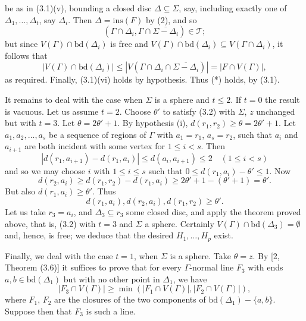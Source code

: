 \noindent be as in (3.1)(v), bounding a closed disc $\Delta \subseteq \Sigma$, say, including exactly one of $\Delta_1, \dots, \Delta_t$, say $\Delta_i$. Then $\Delta = \text{ins}(F)$ by (2), and so
\begin{equation*}
(\Gamma \cap \Delta_i, \Gamma \cap \overline{\Sigma - \Delta_i}) \in \mathscr{T};
\end{equation*}
but since $V(\Gamma) \cap \text{bd}(\Delta_i)$ is free and $V(\Gamma) \cap \text{bd}(\Delta_i) \subseteq V(\Gamma \cap \Delta_i)$, it follows that
\begin{equation*}
|V(\Gamma) \cap \text{bd}(\Delta_i)| \le |V(\Gamma \cap \Delta_i \cap \overline{\Sigma - \Delta_i})| = |F \cap V(\Gamma)|,
\end{equation*}
as required. Finally, (3.1)(vi) holds by hypothesis. Thus (*) holds, by (3.1).

It remains to deal with the case when $\Sigma$ is a sphere and $t \le 2$. If $t = 0$ the result is vacuous. Let us assume $t = 2$. Choose $\theta'$ to satisfy (3.2) with $\Sigma$, $z$ unchanged but with $t = 3$. Let $\theta = 2\theta' + 1$. By hypothesis (i), $d(r_1, r_2) \ge \theta = 2\theta' + 1$. Let $a_1, a_2, \dots, a_s$ be a sequence of regions of $\Gamma$ with $a_1 = r_1$, $a_s = r_2$, such that $a_i$ and $a_{i+1}$ are both incident with some vertex for $1 \le i < s$. Then
\begin{equation*}
|d(r_1, a_{i+1}) - d(r_1, a_i)| \le d(a_i, a_{i+1}) \le 2 \quad (1 \le i < s)
\end{equation*}
and so we may choose $i$ with $1 \le i \le s$ such that $0 \le d(r_1, a_i) - \theta' \le 1$. Now
\begin{equation*}
d(r_2, a_i) \ge d(r_1, r_2) - d(r_1, a_i) \ge 2\theta' + 1 - (\theta' + 1) = \theta'.
\end{equation*}
But also $d(r_1, a_i) \ge \theta'$. Thus
\begin{equation*}
d(r_1, a_i), d(r_2, a_i), d(r_1, r_2) \ge \theta'.
\end{equation*}
Let us take $r_3 = a_i$, and $\Delta_3 \subseteq r_3$ some closed disc, and apply the theorem proved above, that is, (3.2) with $t = 3$ and $\Sigma$ a sphere. Certainly $V(\Gamma) \cap \text{bd}(\Delta_3) = \emptyset$ and, hence, is free; we deduce that the desired $H_1, \dots, H_p$ exist.

Finally, we deal with the case $t = 1$, when $\Sigma$ is a sphere. Take $\theta = z$. By [2, Theorem (3.6)] it suffices to prove that for every $\Gamma$-normal line $F_3$ with ends $a, b \in \text{bd}(\Delta_1)$ but with no other point in $\Delta_1$, we have
\begin{equation*}
|F_3 \cap V(\Gamma)| \ge \min (|F_1 \cap V(\Gamma)|, |F_2 \cap V(\Gamma)|),
\end{equation*}
where $F_1$, $F_2$ are the closures of the two components of $\text{bd}(\Delta_1) - \{a, b\}$. Suppose then that $F_3$ is such a line.

